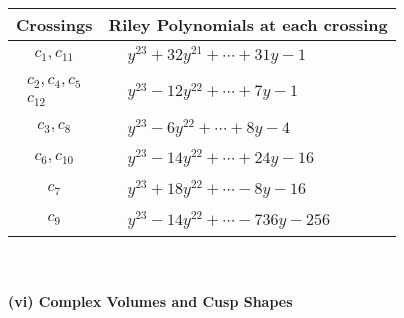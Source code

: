 \documentclass[1p]{elsarticle_modified}
\theoremstyle{definition}
\begin{document}
\begin{tabular}{m{50pt}|m{274pt}}
Crossings & \hspace{64pt}Riley Polynomials at each crossing \\
\hline $$\begin{aligned}c_{1},c_{11}\end{aligned}$$&$\begin{aligned}
&y^{23}+32 y^{21}+\cdots+31 y-1
\end{aligned}$\\
\hline $$\begin{aligned}c_{2},c_{4},c_{5}\\c_{12}\end{aligned}$$&$\begin{aligned}
&y^{23}-12 y^{22}+\cdots+7 y-1
\end{aligned}$\\
\hline $$\begin{aligned}c_{3},c_{8}\end{aligned}$$&$\begin{aligned}
&y^{23}-6 y^{22}+\cdots+8 y-4
\end{aligned}$\\
\hline $$\begin{aligned}c_{6},c_{10}\end{aligned}$$&$\begin{aligned}
&y^{23}-14 y^{22}+\cdots+24 y-16
\end{aligned}$\\
\hline $$\begin{aligned}c_{7}\end{aligned}$$&$\begin{aligned}
&y^{23}+18 y^{22}+\cdots-8 y-16
\end{aligned}$\\
\hline $$\begin{aligned}c_{9}\end{aligned}$$&$\begin{aligned}
&y^{23}-14 y^{22}+\cdots-736 y-256
\end{aligned}$\\
\hline
\end{tabular}\\~\\
\newpage\flushleft \textbf{(vi) Complex Volumes and Cusp Shapes}
\end{document}
